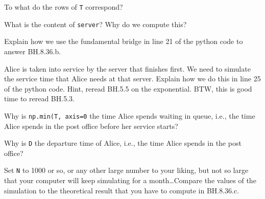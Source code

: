 \documentclass[assignments]{subfiles}
\begin{document}
\begin{exercise}
To what do the rows of \texttt{T} correspond?
\begin{solution}
\end{solution}
\end{exercise}

\begin{exercise}
What is the content of \texttt{server}? Why do we compute this?
\begin{solution}
\end{solution}
\end{exercise}

\begin{exercise}
Explain how we use the fundamental bridge in line 21 of the python code to answer BH.8.36.b.
\begin{solution}
\end{solution}
\end{exercise}


\begin{exercise}
Alice is taken into service by the server that finishes first.
We need to simulate the service time that Alice needs at that server.
Explain how we do this in line 25 of the python code. Hint, reread BH.5.5 on the exponential. BTW, this is good time to reread BH.5.3.
\begin{solution}
\end{solution}
\end{exercise}

\begin{exercise}
Why is \texttt{np.min(T, axis=0} the time Alice spends waiting in queue, i.e., the time Alice spends in the post office before her service starts?
\begin{solution}
\end{solution}
\end{exercise}


\begin{exercise}
Why is \texttt{D} the departure time of Alice, i.e., the time Alice spends in the post office?
\begin{solution}
\end{solution}
\end{exercise}


\begin{exercise}
Set \texttt{N} to 1000 or so, or any other large number to your liking, but not so large that your computer will keep simulating for a month\ldots Compare the values of the simulation to the theoretical result that you have to compute in BH.8.36.c.
\begin{solution}
\end{solution}
\end{exercise}
\end{document}
